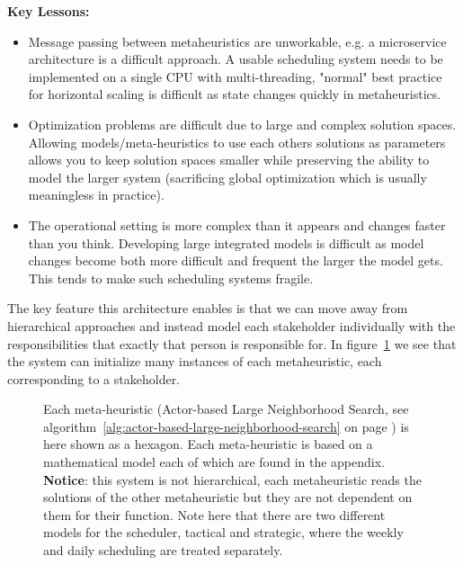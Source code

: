 \textbf{Key Lessons:}
\begin{itemize}[leftmargin=*, labelsep=0.5em]
	\item Message passing between metaheuristics are unworkable, e.g. a microservice
		architecture is a difficult approach. A usable scheduling system needs to
		be implemented on a single CPU with multi-threading, "normal" best practice for
		horizontal scaling is difficult as state changes quickly in metaheuristics.  	
	\item Optimization problems are difficult due to large and complex solution
		spaces. Allowing models/meta-heuristics to use each others solutions as
		parameters allows you to keep solution spaces smaller while preserving the
		ability to model the larger system (sacrificing global optimization which
		is usually meaningless in practice). 	
	\item The operational setting is more
		complex than it appears and changes faster than you think. Developing large
		integrated models is difficult as model changes become both more difficult
		and frequent the larger the model gets. This tends to make such scheduling
		systems fragile.
\end{itemize}

The key feature this architecture enables is that we can move away from hierarchical approaches and 
instead model each stakeholder individually with the responsibilities that exactly that person is responsible 
for. In figure~\ref{fig:model-setup:hexagon} we see that the system can initialize many instances of each metaheuristic, each corresponding to a stakeholder. 

\begin{figure}[H]
	
	\centering
	\drawModelSetupHexagon
	\caption{
		Each meta-heuristic (Actor-based Large Neighborhood Search, see algorithm~\ref{alg:actor-based-large-neighborhood-search} on page \pageref{alg:actor-based-large-neighborhood-search}) is here shown as a hexagon.
		Each meta-heuristic is based on a mathematical model each of which are found in the appendix. \textbf{Notice}: this system is not 
		hierarchical, each metaheuristic reads the solutions of the other metaheuristic but they are not dependent on them for their 
		function. Note here that there are two different models for the scheduler, tactical and strategic, where the weekly and daily scheduling are treated separately.
	}
	\label{fig:model-setup:hexagon}
\end{figure}

